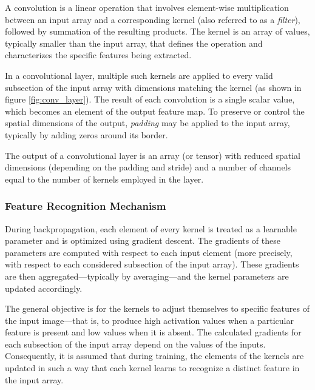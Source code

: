 \documentclass{pracalicmgr}
\begin{document}
A convolution is a linear operation that involves element-wise multiplication between an input array and a corresponding kernel (also referred to as a \textit{filter}), followed by summation of the resulting products. The kernel is an array of values, typically smaller than the input array, that defines the operation and characterizes the specific features being extracted.

In a convolutional layer, multiple such kernels are applied to every valid subsection of the input array with dimensions matching the kernel (as shown in figure \ref{fig:conv_layer}). The result of each convolution is a single scalar value, which becomes an element of the output feature map. To preserve or control the spatial dimensions of the output, \textit{padding} may be applied to the input array, typically by adding zeros around its border.

The output of a convolutional layer is an array (or tensor) with reduced spatial dimensions (depending on the padding and stride) and a number of channels equal to the number of kernels employed in the layer.

\subsubsection{Feature Recognition Mechanism}

During backpropagation, each element of every kernel is treated as a learnable parameter and is optimized using gradient descent. The gradients of these parameters are computed with respect to each input element (more precisely, with respect to each considered subsection of the input array). These gradients are then aggregated—typically by averaging—and the kernel parameters are updated accordingly.

The general objective is for the kernels to adjust themselves to specific features of the input image—that is, to produce high activation values when a particular feature is present and low values when it is absent. The calculated gradients for each subsection of the input array depend on the values of the inputs. Consequently, it is assumed that during training, the elements of the kernels are updated in such a way that each kernel learns to recognize a distinct feature in the input array.
\end{document}
